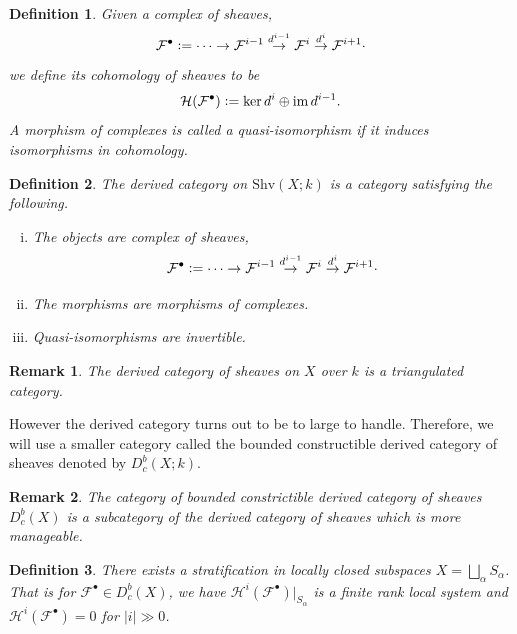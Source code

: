 \documentclass[8pt]{article}
\numberwithin{equation}{section}
\newtheorem{definition}{Definition}[section]
\newtheorem{remark}{Remark}[section]
\DeclareMathOperator{\image}{im}
\newcommand{\defeq}{\vcentcolon=}
\newcommand{\cH}[0]{\mathcal{H}}
\newcommand{\ab}[1]{\vert #1 \vert}
\newcommand{\cF}[0]{\mathcal{F}}
\newcommand{\Shv}[0]{\mathrm{Shv}}
\begin{document}
\begin{definition}
        Given a complex of sheaves,
        \begin{equation*}
            \cF^\bullet \defeq \cdots\to \cF^{i-1}\stackrel{d^{i-1}}{\to}\cF^i\stackrel{d^{i}}{\to}\cF^{i+1}\cdot
        \end{equation*}
        we define its cohomology of sheaves to be 
        \begin{equation*}
            \cH(\cF^\bullet) \defeq\ker d^i\oplus\image d^{i-1}.
        \end{equation*}
        A morphism of complexes is called a quasi-isomorphism if it induces isomorphisms in cohomology.
\end{definition}

\begin{definition}
    The derived category on $\Shv(X;k)$ is a category satisfying the following.
    \begin{enumerate}[i. ]
        \item The objects are complex of sheaves,
        \begin{equation*}
            \cF^\bullet \defeq \cdots\to \cF^{i-1}\stackrel{d^{i-1}}{\to}\cF^i\stackrel{d^{i}}{\to}\cF^{i+1}\cdot
        \end{equation*}
        \item The morphisms are morphisms of complexes.
        \item Quasi-isomorphisms are invertible.
    \end{enumerate}
\end{definition}

\begin{remark}
    The derived category of sheaves on $X$ over $k$ is a triangulated category.
\end{remark}

However the derived category turns out to be to large to handle. Therefore, we will use a smaller category called the bounded constructible derived category of sheaves denoted by $D_c^b(X;k)$.

\begin{remark}
    The category of bounded constrictible derived category of sheaves $D_c^b(X)$ is a subcategory of the derived category of sheaves which is more manageable.
\end{remark}
\begin{definition}
    There exists a stratification in locally closed subspaces $X = \bigsqcup_\alpha S_\alpha$. That is for $\cF^\bullet\in D_c^b(X)$, we have $\cH^i(\cF^\bullet)|_{S_\alpha}$ is a finite rank local system and $\cH^i(\cF^\bullet) = 0$ for $\ab{i}\gg 0$.
\end{definition}
\end{document}
